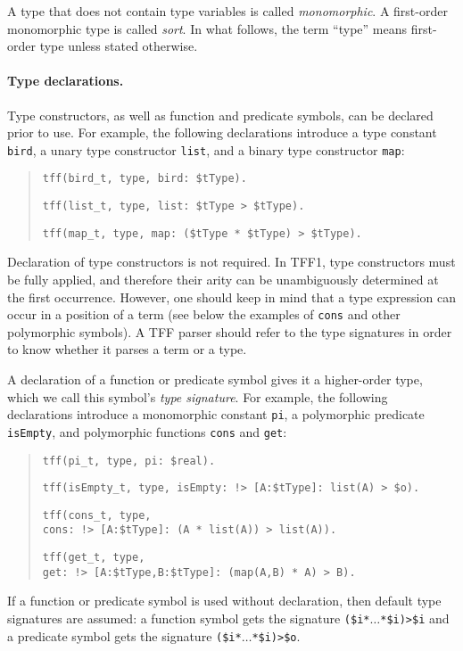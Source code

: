 A type that does not contain type variables is called
{\em monomorphic}.
A first-order monomorphic type is called {\em sort}.
In what follows, the term ``type'' means
first-order type unless stated otherwise.

\paragraph{Type declarations.} Type constructors, as well as
function and predicate symbols, can be declared prior to use.
For example, the following declarations introduce a type
constant {\tt bird}, a unary type constructor {\tt list},
and a binary type constructor {\tt map}:
\begin{quote}
\verb+tff(bird_t, type, bird: $tType).+
\par\medskip
\verb+tff(list_t, type, list: $tType > $tType).+
\par\medskip
\verb+tff(map_t, type, map: ($tType * $tType) > $tType).+
\end{quote}
Declaration of type constructors is not required. In TFF1,
type constructors must be fully applied, and therefore
their arity can be unambiguously determined at the first
occurrence. However, one should keep in mind that a type
expression can occur in a position of a term (see below
the examples of {\tt cons} and other polymorphic symbols).
A TFF parser should refer to the type signatures in order
to know whether it parses a term or a type.

A declaration of a function or predicate symbol gives it
a higher-order type, which we call this symbol's
{\em type signature}. For example, the following
declarations introduce a monomorphic constant {\tt pi},
a polymorphic predicate {\tt isEmpty}, and polymorphic
functions {\tt cons} and {\tt get}:
\begin{quote}
\verb+tff(pi_t, type, pi: $real).+
\par\medskip
\verb+tff(isEmpty_t, type, isEmpty: !> [A:$tType]: list(A) > $o).+
\par\medskip
\verb+tff(cons_t, type,+\\
\mbox{}\hfill
\verb+cons: !> [A:$tType]: (A * list(A)) > list(A)).+
\par\medskip
\verb+tff(get_t, type,+\\
\mbox{}\hfill
\verb+get: !> [A:$tType,B:$tType]: (map(A,B) * A) > B).+
\end{quote}
If a function or predicate symbol is used without declaration,
then default type signatures are assumed:
a function symbol gets the signature
{\tt (\$i\;*\;$\dots$\;*\;\$i)\;>\;\$i} and
a predicate symbol gets the signature
{\tt (\$i\;*\;$\dots$\;*\;\$i)\;>\;\$o}.

